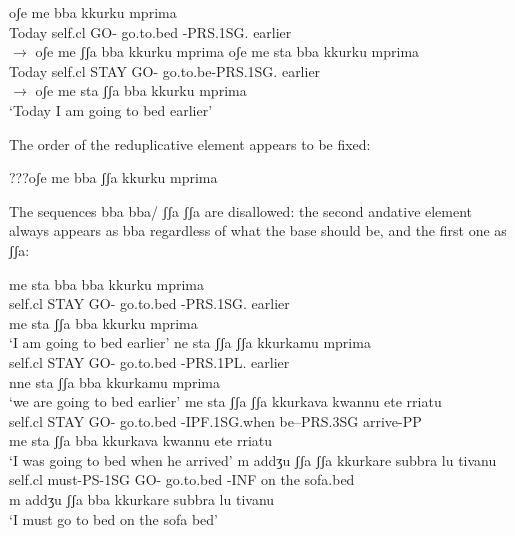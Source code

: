 \documentclass[output=paper]{langscibook}
\begin{document}
\ea \label{ac43}
    \ea \label{ac43a}
        \ea \label{ac43ai}\gll oʃe    me      bba   kkurku         mprima\\
       Today self.cl    GO-   go.to.bed -PRS.1SG.   earlier\\
        \ex \label{ac43aii}$\rightarrow$ oʃe    me    ʃʃa  bba   kkurku         mprima
        \z
    \ex \label{ac43b}
        \ea \label{ac43bi}\gll oʃe    me   sta     bba  kkurku      mprima\\
       Today self.cl  STAY  GO-  go.to.be-PRS.1SG.   earlier\\
        \ex   \label{ac43bii}$\rightarrow$ oʃe    me   sta   ʃʃa bba  kkurku mprima\\
       ‘Today I am going to bed earlier’  
        \z
    \z
\z
 
The order of the reduplicative element appears to be fixed:

\ea \label{ac44}???oʃe me bba ʃʃa kkurku mprima
\z

The sequences bba bba/ ʃʃa ʃʃa are disallowed: the second andative element always appears as bba regardless of what the base should be, and the first one as ʃʃa:

\ea \label{ac45}
    \ea \label{ac45a}\gll *me    sta     bba   bba kkurku      mprima\\
    self.cl  STAY   GO-   go.to.bed -PRS.1SG.   earlier\\
    \glt me sta  ʃʃa bba kkurku mprima\\
     ‘I am going to bed earlier’
    \ex \label{ac45b}\gll *ne    sta     ʃʃa   ʃʃa kkurkamu       mprima\\
    self.cl  STAY     GO-  go.to.bed -PRS.1PL.   earlier\\
    \glt nne sta ʃʃa bba kkurkamu mprima\\
    ‘we are going to bed earlier’
    \ex \label{ac45c}\gll *me   sta  ʃʃa ʃʃa kkurkava      kwannu ete rriatu\\
    self.cl  STAY  GO- go.to.bed -IPF.1SG.when  be--PRS.3SG arrive-PP\\
    \glt me sta ʃʃa bba kkurkava kwannu ete rriatu\\
    ‘I was going to bed when he arrived’
    \ex \label{ac45d}\gll *m   addʒu     ʃʃa ʃʃa  kkurkare    subbra lu tivanu\\
     self.cl  must-PS-1SG  GO- go.to.bed -INF  on    the  sofa.bed\\
    \glt m addʒu ʃʃa bba kkurkare subbra lu tivanu\\
    ‘I must go to bed on the sofa bed’
    \z
\z
\end{document}
